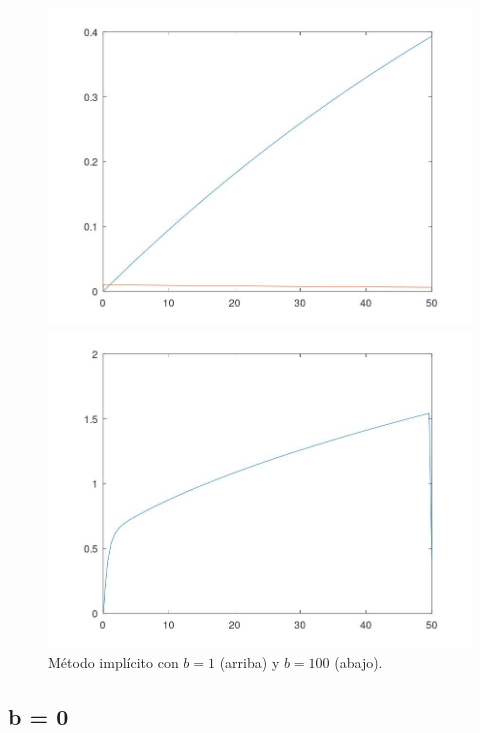 \documentclass[a4paper,12pt]{article}
\begin{document}
\begin{figure}[H]
\vspace{0.5em}

\begin{minipage}[b]{0.48\textwidth}
    \centering
    \includegraphics[width=\textwidth]{img/ej11_3.jpeg}
\end{minipage}
\hfill
\begin{minipage}[b]{0.48\textwidth}
    \centering
    \includegraphics[width=\textwidth]{img/ej11_4.jpeg}
\end{minipage}

\caption{Método implícito con \( b = 1 \) (arriba) y \( b = 100 \) (abajo).}
\end{figure}

\subsection*{b = 0}
\end{document}
